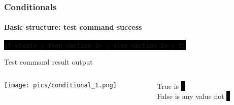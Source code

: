 \documentclass[unknownkeysallowed, 10pt, a4 paper, handout]{beamer}
\newcommand{\code}[1]{\colorbox{black}{\color{green}\texttt{#1}}}
\begin{document}
\begin{frame}
  \frametitle{Conditionals}
  \framesubtitle{Basic structure: test command success}

  \begin{block}{}
    \code{if <test> ; then <action 1> ; else <action 2> ; fi}
  \end{block}

  \begin{exampleblock}{Test command result output}
    \begin{columns}
      \begin{column}{0.60\textwidth}
        \begin{center}
          \texttt{[image: pics/conditional\_1.png]}
        \end{center}
      \end{column}
      \begin{column}{0.40\textwidth}
          True is \code{0} \\
          False is any value not \code{0}
      \end{column}
    \end{columns}
  \end{exampleblock}
\end{frame}
\end{document}
